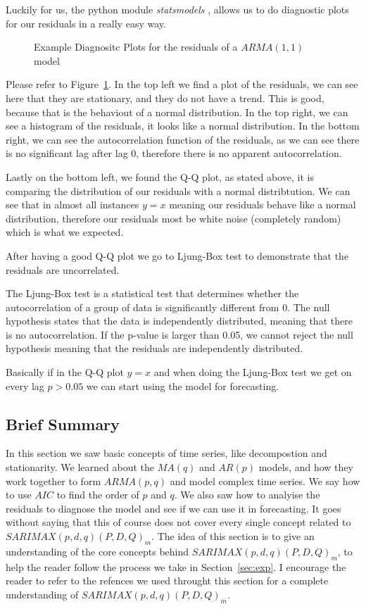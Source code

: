 \documentclass[journal]{IEEEtran}
\begin{document}
Luckily for us, the python module \emph{statsmodels} \cite{statsmodels},
allows us to do diagnostic plots for our residuals in a really easy way. 

\begin{figure}[htbp]
  \centering
  
    \caption{Example Diagnositc Plots for the residuals of a $ARMA(1,1)$ model}
  \label{fig:diag-example}
\end{figure}

Please refer to Figure~\ref{fig:diag-example}. In the top left we find a plot
of the residuals, we can see here that they are stationary, and they do not
have a trend. This is good, because that is the behaviout of a normal
distribution. In the top right, we can see a histogram of the residuals, it
looks like a normal distribution. In the bottom right, we can see the
autocorrelation function of the residuals, as we can see there is no
significant lag after lag 0, therefore there is no apparent autocorrelation.

Lastly on the bottom left, we found the Q-Q plot, as stated above, it is
comparing the distribution of our residuals with a normal distribtution. We
can see that in almost all instances $y=x$ meaning our residuals behave like a
normal distribution, therefore our residuals most be white noise (completely
random) which is what we expected.

After having a good Q-Q plot we go to Ljung-Box test to demonstrate that the
residuals are uncorrelated.

The Ljung-Box test is a statistical test that determines whether the
autocorrelation of a group of data is significantly different from 0.
The null hypothesis states that the data is independently distributed,
meaning that there is no autocorrelation. If the p-value is larger than
0.05, we cannot reject the null hypothesis meaning that the residuals are
independently distributed. \cite{timeseries}

Basically if in the Q-Q plot $y = x$ and when doing the Ljung-Box  test we get
on every lag $p > 0.05$ we can start using the model for forecasting.

\subsection{Brief Summary}

In this section we saw basic concepts of time series,  like decompostion and
stationarity. We learned about the $MA(q)$ and $AR(p)$ models, and how they
work together to form $ARMA(p,q)$ and model complex time series. We say how to
use $AIC$ to find the order of $p$ and $q$. We also saw how to analyise the
residuals to diagnose the model and see if we can use it in forecasting. It
goes without saying that this of course does not cover every single concept
related to $SARIMAX(p,d,q)(P,D,Q)_m$. The idea of this section is to give an
understanding of the core concepts behind $SARIMAX(p,d,q)(P,D,Q)_m$, to help
the reader follow the process we take in Section~\ref{sec:exp}. I encourage
the reader to refer to the refences we used throught this section for a
complete understanding of $SARIMAX(p,d,q)(P,D,Q)_m$.
\end{document}
